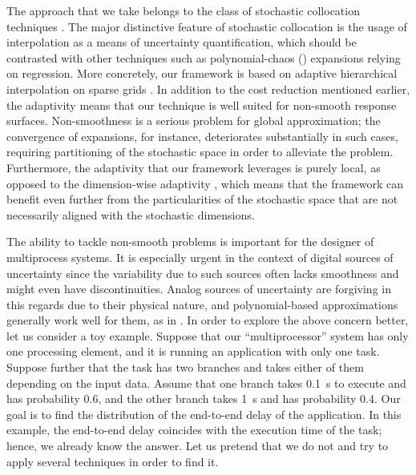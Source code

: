 The approach that we take belongs to the class of stochastic collocation
techniques \cite{xiu2010}. The major distinctive feature of stochastic
collocation is the usage of interpolation as a means of uncertainty
quantification, which should be contrasted with other techniques such as
polynomial-chaos () expansions relying on regression. More concretely,
our framework is based on adaptive hierarchical interpolation on sparse grids
\cite{klimke2006, ma2009}. In addition to the cost reduction mentioned earlier,
the adaptivity means that our technique is well suited for non-smooth response
surfaces. Non-smoothness is a serious problem for global approximation; the
convergence of  expansions, for instance, deteriorates substantially in
such cases, requiring partitioning of the stochastic space in order to alleviate
the problem. Furthermore, the adaptivity that our framework leverages is purely
local, as opposed to the dimension-wise adaptivity \cite{klimke2006}, which
means that the framework can benefit even further from the particularities of
the stochastic space that are not necessarily aligned with the stochastic
dimensions.


The ability to tackle non-smooth problems is important for the designer of
multiprocess systems. It is especially urgent in the context of digital sources
of uncertainty since the variability due to such sources often lacks smoothness
and might even have discontinuities. Analog sources of uncertainty are forgiving
in this regards due to their physical nature, and polynomial-based
approximations generally work well for them, as in \cite{bhardwaj2008, lee2013,
ukhov2014, ukhov2015}. In order to explore the above concern better, let us
consider a toy example. Suppose that our ``multiprocessor'' system has only one
processing element, and it is running an application with only one task. Suppose
further that the task has two branches and takes either of them depending on the
input data. Assume that one branch takes 0.1~s to execute and has probability
0.6, and the other branch takes 1~s and has probability 0.4. Our goal is to find
the distribution of the end-to-end delay of the application. In this example,
the end-to-end delay coincides with the execution time of the task; hence, we
already know the answer. Let us pretend that we do not and try to apply several
techniques in order to find it.


